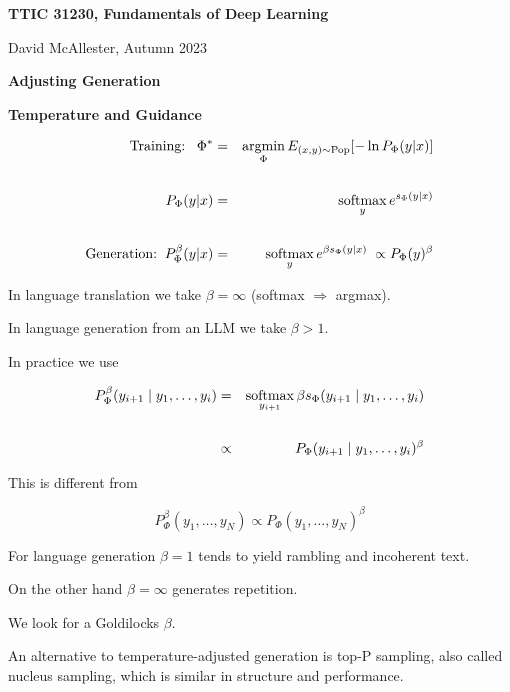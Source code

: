 

\usepackage{cancel}



{\Huge

  \centerline{\bf TTIC 31230, Fundamentals of Deep Learning}
  \bigskip
  \centerline{David McAllester, Autumn 2023}
  \vfill
  \vfil
  \centerline{\bf Adjusting Generation}
  \vfill
  \centerline{\bf Temperature and Guidance}
  \vfill
  \vfill

\begin{eqnarray*}
\mbox{Training:}\;\;\;\Phi^* & = & \operatorname*{argmin}_\Phi E_{(x,y) \sim \mathrm{Pop}}[-\ln P_\Phi(y|x)] \\
\\
P_\Phi(y|x) & = & \operatorname*{softmax}_y e^{s_\Phi(y|x)} \\
\\
\mbox{Generation:}\;\;P^\beta_\Phi(y|x) & = & \operatorname*{softmax}_y e^{\beta s_\Phi(y|x)}\;\propto P_\Phi(y)^\beta
\end{eqnarray*}

\vfill
In language translation we take $\beta = \infty$ (softmax $\Rightarrow$ argmax).

\vfill
In language generation from an LLM we take $\beta > 1$.


In practice we use

\begin{eqnarray*}
P^\beta_\Phi(y_{i+1}\;|\;y_1,\ldots,y_i) & = & \operatorname*{softmax}_{y_{i+1}} \beta s_\Phi(y_{i+1}\;|\;y_1,\dots,y_i) \\
\\
& \propto &  P_\Phi(y_{i+1}\;|\;y_1,\ldots,y_i)^\beta
\end{eqnarray*}

\vfill
This is different from

\vfill
$$P^\beta_\Phi(y_1,\ldots,y_N) \propto P_\Phi(y_1,\ldots,y_N)^\beta$$


For language generation $\beta = 1$ tends to yield rambling and incoherent text.

\vfill
On the other hand $\beta = \infty$ generates repetition.

\vfill
We look for a Goldilocks $\beta$.

\vfill
An alternative to temperature-adjusted generation is top-P sampling, also called nucleus sampling, which is similar in structure and performance.

}
